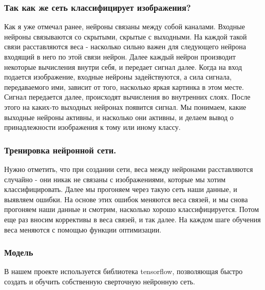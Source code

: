 \subsubsection{Так как же сеть классифицирует изображения?}
Как я уже отмечал ранее, нейроны связаны между собой каналами. 
Входные нейроны связываются со скрытыми, скрытые с выходными. На каждой такой связи расставляются веса - насколько сильно важен для следующего нейрона входящий в него по этой связи нейрон. Далее каждый нейрон производит некоторые вычисления внутри себя, и передает сигнал далее.
Когда на вход подается изображение, входные нейроны задействуются, а сила сигнала, передаваемого ими, зависит от того, насколько яркая картинка в этом месте. Сигнал передается далее, происходят вычисления во внутренних слоях. После этого на каких-то выходных нейронах появится сигнал. Мы понимаем, какие выходные нейроны активны, и насколько они активны, и делаем вывод о принадлежности изображения к тому или иному классу.
\subsubsection{Тренировка нейронной сети.}
Нужно отметить, что при создании сети, веса между нейронами расставляются случайно - они никак не связаны с изображениями, которые мы хотим классифицировать. Далее мы прогоняем через такую сеть наши данные, и выявляем ошибки. На основе этих ошибок меняются веса связей, и мы снова прогоняем наши данные и смотрим, насколько хорошо классифицируется. Потом еще раз вносим коррективы в веса связей, и так далее. На каждом шаге обучения веса меняются с помощью функции оптимизации.


\subsubsection{Модель}

В нашем проекте используется библиотека tensorflow, позволяющая быстро создать и обучить собственную сверточную нейронную сеть. 

